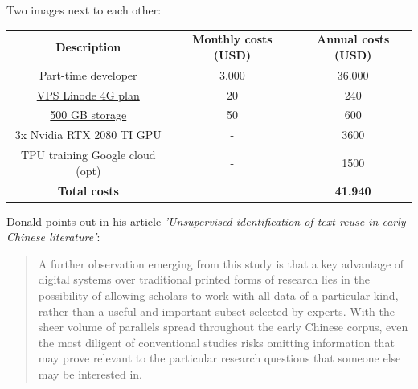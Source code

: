 Two images next to each other:
\begin{figure}[!tbp]
  \centering
  \hfill
\end{figure}



\begin{tabular}{ c c c }
 \textbf{Description} & \textbf{Monthly costs (USD)} & \textbf{Annual costs (USD)} \\ 
 Part-time developer & 3.000 & 36.000 \\  
 \href{https://www.linode.com/pricing}{VPS Linode 4G plan} & 20 & 240 \\
  \href{https://www.linode.com/blockstorage}{500 GB storage} & 50 & 600 \\
  3x Nvidia RTX 2080 TI GPU & - & 3600 \\
  TPU training Google cloud (opt) & - & 1500 \\
 \textbf{Total costs} & & \textbf{41.940}
\end{tabular}


Donald \cite{sturgeon2017} points out in his article {\em 'Unsupervised identification of text reuse in early Chinese literature'}: 

\begin{quote}
A further observation emerging from this study is that a key advantage of digital systems over traditional printed forms of research lies in the possibility of allowing scholars to work with all data of a particular kind, rather than a useful and important subset selected by experts. With the sheer volume of parallels spread throughout the early Chinese corpus, even the most diligent of conventional studies risks omitting information that may prove relevant to the particular research questions that someone else may be interested in.
\end{quote}
